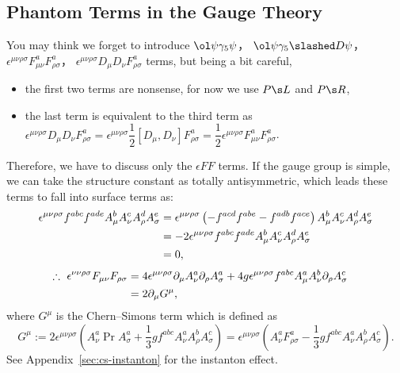 \subsection{Phantom Terms in the Gauge Theory}
\label{sec:no-other-term}
You may think we forget to introduce
$\ol\psi\G5\psi$，
$\ol\psi\G5\slashed D\psi$，
$\epsilon^{\mu\nu\rho\sigma}F^a_{\mu\nu}F^a_{\rho\sigma}$，
$\epsilon^{\mu\nu\rho\sigma}D_\mu D_\nu F^a_{\rho\sigma}$
terms, but being a bit careful,
\begin{itemize}
 \item the first two terms are nonsense, for now we use $\PL$ and $\PR$,
 \item the last term is equivalent to the third term as\\[.5zw]\qquad
$\epsilon^{\mu\nu\rho\sigma}D_\mu D_\nu F^a_{\rho\sigma}
=\epsilon^{\mu\nu\rho\sigma}\dfrac12[D_\mu,D_\nu]F^a_{\rho\sigma}
=\dfrac12\epsilon^{\mu\nu\rho\sigma}F^a_{\mu\nu}F^a_{\rho\sigma}$.
\end{itemize}\vspace{.5zw}
Therefore, we have to discuss only the $\epsilon FF$ terms.
If the gauge group is simple, we can take the structure constant as totally antisymmetric, which leads these terms to fall into surface terms as:
\begin{align}
 \epsilon^{\mu\nu\rho\sigma}f^{abc}f^{ade}A^b_\mu A^c_\nu A^d_\rho A^e_\sigma
 &= \epsilon^{\mu\nu\rho\sigma}\left(-f^{acd}f^{abe}-f^{adb}f^{ace}\right)
     A^b_\mu A^c_\nu A^d_\rho A^e_\sigma\notag\\
 &= -2\epsilon^{\mu\nu\rho\sigma}f^{abc}f^{ade}A^b_\mu A^c_\nu A^d_\rho A^e_\sigma\\
 &=  0,\notag
\end{align}
\begin{align}
 \therefore\ \epsilon^{\nu\nu\rho\sigma}F_{\mu\nu}F_{\rho\sigma}
&= 4\epsilon^{\mu\nu\rho\sigma}\partial_\mu A^a_\nu\partial_\rho A^a_\sigma
 + 4g\epsilon^{\mu\nu\rho\sigma}f^{abc}A^a_\mu A^b_\nu\partial_\rho A^c_\sigma\notag\\
&= 2\partial_\mu G^\mu,&
\end{align}
where $G^\mu$ is the Chern--Simons term which is defined as
\begin{equation}
  G^\mu
:= 2\epsilon^{\mu\nu\rho\sigma}
\left( A^a_\nu\Pr A^a_\sigma+\frac13gf^{abc}A^a_\nu A^b_\rho A^c_\sigma \right)
= \epsilon^{\mu\nu\rho\sigma}
\left( A^a_\nu F^a_{\rho\sigma}-\frac13gf^{abc}A^a_\nu A^b_\rho A^c_\sigma \right).
\end{equation}
See Appendix~\ref{sec:cs-instanton} for the instanton effect.

